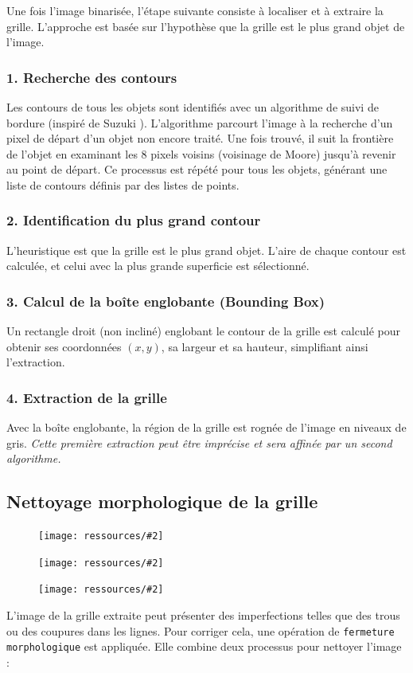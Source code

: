 \documentclass{article}
\newcommand{\stepimage}[3][0.3\textwidth]{%
  \minipage{#1}
    \texttt{[image: ressources/\#2]}
    \caption{#3}
  \endminipage\hfill
}
\begin{document}
Une fois l'image binarisée, l'étape suivante consiste à localiser et à extraire la grille. L'approche est basée sur l'hypothèse que la grille est le plus grand objet de l'image.

\subsubsection{1. Recherche des contours}
Les contours de tous les objets sont identifiés avec un algorithme de suivi de bordure (inspiré de Suzuki \cite{suzuki1985topological}). L'algorithme parcourt l'image à la recherche d'un pixel de départ d'un objet non encore traité. Une fois trouvé, il suit la frontière de l'objet en examinant les 8 pixels voisins (voisinage de Moore) jusqu'à revenir au point de départ. Ce processus est répété pour tous les objets, générant une liste de contours définis par des listes de points.

\subsubsection{2. Identification du plus grand contour}
L'heuristique est que la grille est le plus grand objet. L'aire de chaque contour est calculée, et celui avec la plus grande superficie est sélectionné.

\subsubsection{3. Calcul de la boîte englobante (Bounding Box)}
Un rectangle droit (non incliné) englobant le contour de la grille est calculé pour obtenir ses coordonnées \((x, y)\), sa largeur et sa hauteur, simplifiant ainsi l'extraction.

\subsubsection{4. Extraction de la grille}
Avec la boîte englobante, la région de la grille est rognée de l'image en niveaux de gris. \newline\textcolor{orange}{\HandRight} \textit{Cette première extraction peut être imprécise et sera affinée par un second algorithme.}

\subsection{Nettoyage morphologique de la grille}

\begin{figure}[!htb]
  \stepimage[0.30\textwidth]{image_1_step_07_cleaned_grid.png}{}
  \stepimage[0.30\textwidth]{image_2_step_07_cleaned_grid.png}{}
  \stepimage[0.26\textwidth]{image_3_step_07_cleaned_grid.png}{}
\end{figure}
L'image de la grille extraite peut présenter des imperfections telles que des trous ou des coupures dans les lignes. Pour corriger cela, une opération de \texttt{fermeture morphologique} est appliquée. Elle combine deux processus pour nettoyer l'image \cite{serra1982image}:
\end{document}
